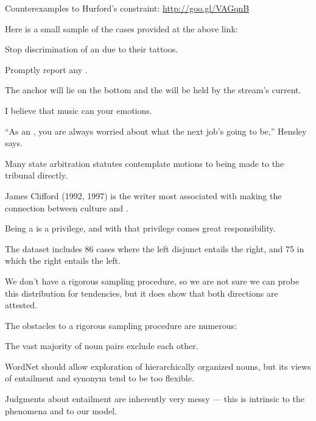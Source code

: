 \documentclass{article}
\begin{document}
\begin{examples}
\item\label{ourcorpus} Counterexamples to Hurford's constraint:
  \url{http://goo.gl/VAGqnB}

\item Here is a small sample of the cases provided at the above link:

  \begin{examples}
  \item Stop discrimination of an  due to their tattoos.
  \item Promptly report any .
  \item The anchor will lie on the bottom and the  will be held by the stream's current.
  \item I believe that music can  your emotions.
  \item ``As an , you are always worried about what the next job's going to be,'' Hensley says.
  \item Many state arbitration statutes contemplate motions to  being made to the tribunal directly.
  \item James Clifford (1992, 1997) is the writer most associated with making the connection between culture and .
  \item Being a  is a privilege, and with that privilege comes great responsibility.
  \end{examples}

\item The dataset includes 86 cases where the left disjunct entails
  the right, and 75 in which the right entails the left.  

\item We don't have a rigorous sampling procedure, so we are not sure
  we can probe this distribution for tendencies, but it does show that
  both directions are attested.  

\item The obstacles to a rigorous sampling procedure are numerous:   
  \begin{examples}
  \item The vast majority of noun pairs exclude each other.
  \item WordNet should allow exploration of hierarchically organized
    nouns, but its views of entailment and synonym tend to be too
    flexible.
  \item Judgments about entailment are inherently very messy --- this
    is intrinsic to the phenomena and to our model.
  \end{examples}


\end{examples}
\end{document}
